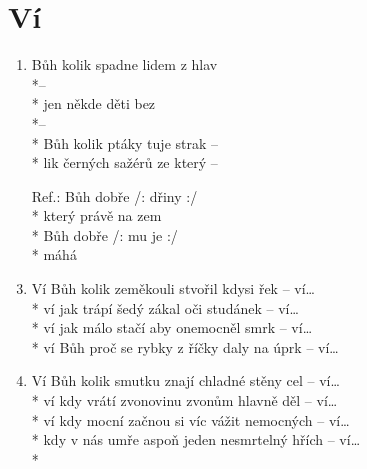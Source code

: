 \section{Ví}
\begin{enumerate}
\item {} Bůh kolik  spadne  lidem z hlav \\*\hspace*{1cm}--    \\*
 jen někde  děti  bez  \\*\hspace*{1cm}--     \\*
 Bůh kolik  ptáky tuje strak --    \\*
lik černých sažérů ze který  --    
\item[Ref.:]    Bůh dobře /:  dřiny :/ \\*
 který právě na zem  \\*
Bůh dobře /:            mu je :/ \\*
máhá    
\item Ví Bůh kolik zeměkouli stvořil kdysi řek -- ví… \\*
ví jak trápí šedý zákal oči studánek -- ví… \\*
ví jak málo stačí aby onemocněl smrk -- ví… \\*
ví Bůh proč se rybky z říčky daly na úprk -- ví… 
\item Ví Bůh kolik smutku znají chladné stěny cel -- ví… \\*
ví kdy vrátí zvonovinu zvonům hlavně děl -- ví… \\*
ví kdy mocní začnou si víc vážit nemocných -- ví… \\*
kdy v nás umře aspoň jeden nesmrtelný hřích -- ví… \\*
\end{enumerate}
